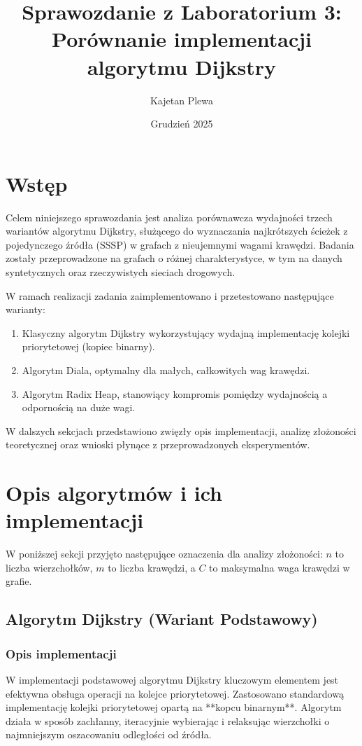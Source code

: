 \documentclass[11pt, a4paper]{article}
\title{Sprawozdanie z Laboratorium 3: Porównanie implementacji algorytmu Dijkstry}
\author{Kajetan Plewa}
\date{Grudzień 2025}
\begin{document}
	\maketitle
	\thispagestyle{empty}
	\clearpage
	
	\section*{Wstęp}
	
	Celem niniejszego sprawozdania jest analiza porównawcza wydajności trzech wariantów algorytmu Dijkstry, służącego do wyznaczania najkrótszych ścieżek z pojedynczego źródła (SSSP) w grafach z nieujemnymi wagami krawędzi. Badania zostały przeprowadzone na grafach o różnej charakterystyce, w tym na danych syntetycznych oraz rzeczywistych sieciach drogowych.
	
	W ramach realizacji zadania zaimplementowano i przetestowano następujące warianty:
	\begin{enumerate}
		\item Klasyczny algorytm Dijkstry wykorzystujący wydajną implementację kolejki priorytetowej (kopiec binarny).
		\item Algorytm Diala, optymalny dla małych, całkowitych wag krawędzi.
		\item Algorytm Radix Heap, stanowiący kompromis pomiędzy wydajnością a odpornością na duże wagi.
	\end{enumerate}
	W dalszych sekcjach przedstawiono zwięzły opis implementacji, analizę złożoności teoretycznej oraz wnioski płynące z przeprowadzonych eksperymentów.
	
	\clearpage
	
	\section*{Opis algorytmów i ich implementacji}
	
	W poniższej sekcji przyjęto następujące oznaczenia dla analizy złożoności: $n$ to liczba wierzchołków, $m$ to liczba krawędzi, a $C$ to maksymalna waga krawędzi w grafie.
	
	\subsection{Algorytm Dijkstry (Wariant Podstawowy)}
	
	\subsubsection*{Opis implementacji}
	W implementacji podstawowej algorytmu Dijkstry kluczowym elementem jest efektywna obsługa operacji na kolejce priorytetowej. Zastosowano standardową implementację kolejki priorytetowej opartą na **kopcu binarnym**. Algorytm działa w sposób zachłanny, iteracyjnie wybierając i relaksując wierzchołki o najmniejszym oszacowaniu odległości od źródła.
	
\end{document}
